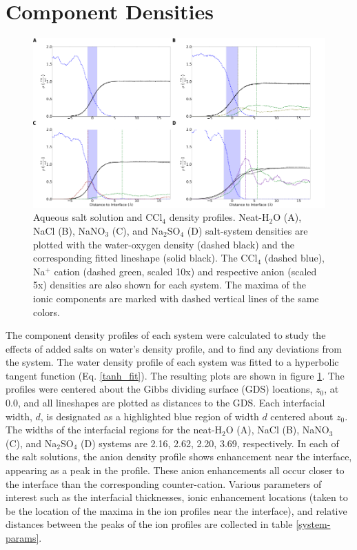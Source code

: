 \section{Component Densities}

\begin{figure}[h!]
\begin{center}
	\includegraphics[scale=1.0]{images/densities.png}
	\caption{Aqueous salt solution and CCl$_4$ density profiles. Neat-H$_2$O (A), NaCl (B), NaNO$_3$ (C), and Na$_2$SO$_4$ (D) salt-system densities are plotted with the water-oxygen density (dashed black) and the corresponding fitted lineshape (solid black). The CCl$_4$ (dashed blue), Na$^+$ cation (dashed green, scaled 10x) and respective anion (scaled 5x) densities are also shown for each system. The maxima of the ionic components are marked with dashed vertical lines of the same colors.}
	\label{fig:density-plots}
\end{center}
\end{figure}

The component density profiles of each system were calculated to study the effects of added salts on water's density profile, and to find any deviations from the \ctcwat system. The water density profile of each system was fitted to a hyperbolic tangent function (Eq. \ref{tanh_fit}). The resulting plots are shown in figure \ref{fig:density-plots}. The profiles were centered about the Gibbs dividing surface (GDS) locations, $z_0$, at 0.0\angs, and all lineshapes are plotted as distances to the GDS. Each interfacial width, $d$, is designated as a highlighted blue region of width $d$ centered about $z_0$.  The widths of the interfacial regions for the neat-H$_2$O (A), NaCl (B), NaNO$_3$ (C), and Na$_2$SO$_4$ (D) systems are 2.16, 2.62, 2.20, 3.69\angs, respectively. In each of the salt solutions, the anion density profile shows enhancement near the interface, appearing as a peak in the profile. These anion enhancements all occur closer to the interface than the corresponding counter-cation. Various parameters of interest such as the interfacial thicknesses, ionic enhancement locations (taken to be the location of the maxima in the ion profiles near the interface), and relative distances between the peaks of the ion profiles are collected in table \ref{system-params}.

